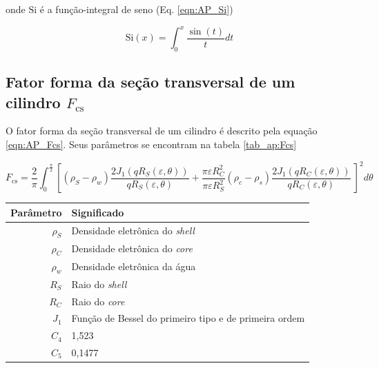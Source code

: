 \begin{apendicesenv}
\noindent onde \(\mathrm{Si}\) é a função-integral de seno (Eq. \ref{eqn:AP_Si})

\begin{equation}
\mathrm{Si}(x) = \int_0^x \frac{\sin (t)}{t}dt
\label{eqn:AP_Si}
\end{equation}

\subsection{Fator forma da seção transversal de um cilindro \(F_{\mathrm{cs}}\)}

O fator forma da seção transversal de um cilindro é descrito pela equação \ref{eqn:AP_Fcs}. Seus parâmetros se encontram na tabela \ref{tab_ap:Fcs}

\begin{equation}
F_{\mathrm{cs}} = \frac{2}{\pi}\int_{0}^{\frac{\pi}{2}}%
%
\left[ \left(\rho_{S} - \rho_{w} \right) \frac{2J_1 \left( qR_{S}\left( \varepsilon,\theta \right) \right)}{qR_{S}\left( \varepsilon,\theta \right)} %
%
+  %
%
\frac{\pi\varepsilon R_C^2}{\pi\varepsilon R_S^2}\left( \rho_c - \rho_s \right)	%
%
\frac{2J_1\left( qR_{C}\left( \varepsilon,\theta \right) \right)}{qR_{C}\left( \varepsilon,\theta \right)}\  \right]^2 d\theta
\label{eqn:AP_Fcs}
\end{equation}


\begin{table}
    {\begin{tabular}{r l}
            \toprule
            Parâmetro 			& Significado \\
            \midrule
            \(\rho_S\)			&  Densidade eletrônica do \emph{shell} \\
            \(\rho_C\)			&  Densidade eletrônica do \emph{core}  \\
            \(\rho_w\)			&  Densidade eletrônica da água			\\
            \(R_S\)			& Raio do \emph{shell} 						\\
            \(R_C\)			& Raio do \emph{core}						\\
            \(J_1\)			&  Função de Bessel do primeiro tipo e de primeira ordem\\
            \(C_4\)			&  1,523	\\
            \(C_5\)			&  0,1477 	\\						
            \bottomrule
        \end{tabular}}%
    {}%
\end{table}


\end{apendicesenv}
